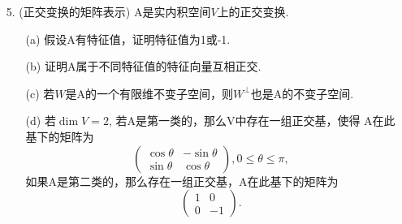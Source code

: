 \begin{itemize}
    \item[5.] (正交变换的矩阵表示) A是实内积空间$V$上的正交变换.
    \begin{itemize}
        \item [(a)] 假设A有特征值，证明特征值为1或-1.
        \vspace{2cm}
        
        \item [(b)] 证明A属于不同特征值的特征向量互相正交.
        \vspace{2cm}
        
        \item [(c)] 若$W$是A的一个有限维不变子空间，则$W^{\perp}$也是A的不变子空间.
        \vspace{2cm}

        \item [(d)] 若$\dim V = 2$, 若A是第一类的，那么V中存在一组正交基，使得
        A在此基下的矩阵为
        \begin{equation}
        \nonumber
        \begin{pmatrix}
            \cos \theta& -\sin \theta\\
            \sin \theta&  \cos \theta 
        \end{pmatrix},
        0 \le \theta \le \pi,
        \end{equation}
        如果A是第二类的，那么存在一组正交基，A在此基下的矩阵为
        \begin{equation}
        \nonumber
        \begin{pmatrix}
            1& 0\\
            0&-1 
        \end{pmatrix}.
        \end{equation}
        \vspace{4cm}


\end{itemize}
\end{itemize}
